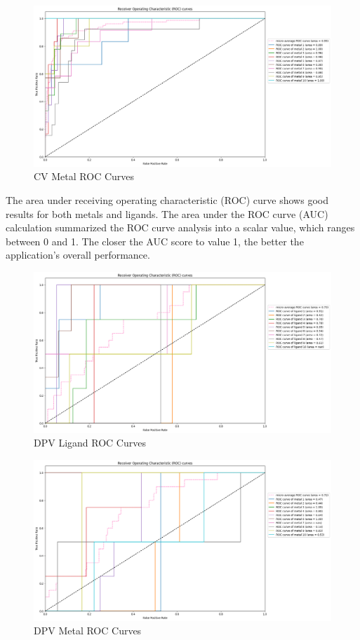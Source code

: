 \begin{figure}[h!]
  \centering
    \includegraphics[width=1.0\textwidth]{figures/metal_roc.png}
    \caption{CV Metal ROC Curves}
    \label{metal_roc}
\end{figure}
The area under receiving operating characteristic (ROC) curve shows good results for both metals and ligands. The area under the ROC curve (AUC) calculation summarized the ROC curve analysis into a scalar value, which ranges between 0 and 1. The closer the AUC score to value 1, the better the application’s overall performance.
\begin{figure}[h!]
  \centering
    \includegraphics[width=1.0\textwidth]{figures/dpv_ligand_roc.png}
    \caption{DPV Ligand ROC Curves}
    \label{dpv_ligand_roc}
\end{figure}
\begin{figure}[h!]
  \centering
    \includegraphics[width=1.0\textwidth]{figures/dpv_metal_roc.png}
    \caption{DPV Metal ROC Curves}
    \label{dpv_metal_roc}
\end{figure}
